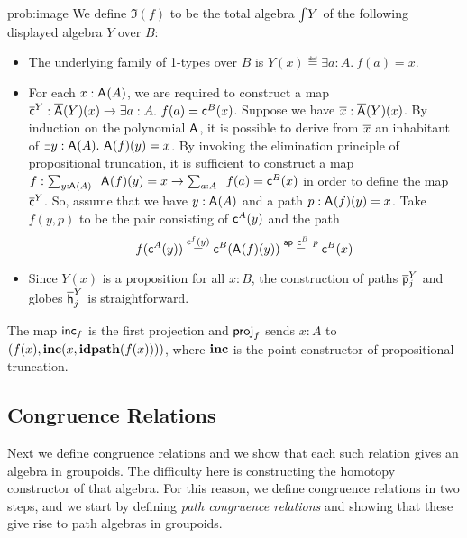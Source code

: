 \begin{construction}{prob:image}
We define $\Im(f)$ to be the total algebra $\textstyle \int_{}{Y}$ of the following displayed algebra $Y$ over $B$:
\begin{itemize}
\item The underlying family of 1-types over $B$ is $Y(x) \eqdef \exists a : A.\ f(a) = x$.
\item For each $x : \mathsf{A}^{}(A)$, we are required to construct
a map $\overline{\mathsf{c}}^{Y} : \overline{\mathsf{A}^{}}(Y)(x) \rightarrow
\exists a : A.\ f(a) = \mathsf{c}^{B}(x)$. Suppose we have $\overline{x}
: \overline{\mathsf{A}^{}}(Y)(x)$. By induction on the polynomial
$\mathsf{A}^{}$, it is possible to derive from $\overline{x}$ an
inhabitant of $\exists y
: \mathsf{A}^{}(A).\ \mathsf{A}^{}(f)(y) = x$. By
invoking the elimination principle of propositional truncation, it is sufficient to
construct a map $f : \Sum {y
: \polyAct{\pointconstr}{A}}.\ \polyAct{\pointconstr}{f}(y) =
x \rightarrow \Sum {a : A}.\ f(a) = \AlgPoint{B}(x)$ in
order to define the map $\overline{\mathsf{c}}^{Y}$.  So, assume that we have
$y : \mathsf{A}^{}(A)$ and a path $p
: \mathsf{A}^{}(f)(y) = x$. Take $f(y,p)$ to be the pair
consisting of $\mathsf{c}^{A}(y)$ and the path
\[
f(\mathsf{c}^{A}(y))
\stackrel{\mathsf{c}^{f}(y)}{=}
\mathsf{c}^{B}(\mathsf{A}^{}(f)(y))
\stackrel{\mathsf{ap} \ \mathsf{c}^{B} \ p}{=}
\mathsf{c}^{B}(x)
\]
\item Since $Y(x)$ is a proposition for all $x : B$, the construction of
paths $\overline{\mathsf{p}}^{Y}_{j}$ and globes $\overline{\mathsf{h}}^{Y}_{j}$ is
straightforward.
\end{itemize}

The map $\mathsf{inc}_{f}$ is the first projection and $\mathsf{proj}_{f}$ sends $x : A$ to
$(f(x),\operatorname{\mathbf{inc}}(x,\operatorname{\mathbf{idpath}}(f(x))))$, where $\operatorname{\mathbf{inc}}$ is the point constructor of
propositional truncation. 
\end{construction}

\subsection{Congruence Relations}
Next we define congruence relations and we show that each such relation gives an algebra in groupoids.
The difficulty here is constructing the homotopy constructor of that algebra.
For this reason, we define congruence relations in two steps, and we start by defining \emph{path congruence relations} and showing that these give rise to path algebras in groupoids.

